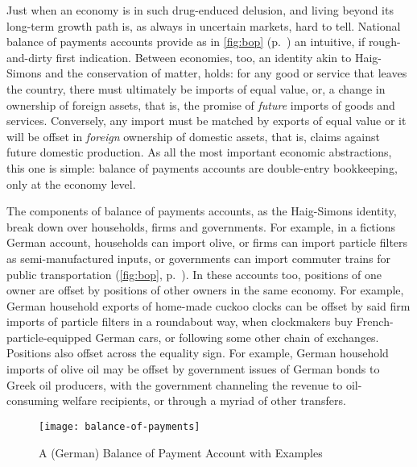 Just when an economy is in such drug-enduced delusion, and living beyond its long-term growth path is, as always in uncertain markets, hard to tell.
National balance of payments accounts provide as in \autoref{fig:bop} (p.~\pageref{fig:bop}) an intuitive, if rough-and-dirty first indication.
Between economies, too, an identity akin to Haig-Simons and the conservation of matter, holds:
for any good or service that leaves the country, there must ultimately be imports of equal value, or, a change in ownership of foreign assets, that is, the promise of \emph{future} imports of goods and services.
Conversely, any import must be matched by exports of equal value or it will be offset in \emph{foreign} ownership of domestic assets, that is, claims against future domestic production.
As all the most important economic abstractions, this one is simple:
balance of payments accounts are double-entry bookkeeping, only at the economy level.

The components of balance of payments accounts, as the Haig-Simons identity, break down over households, firms and governments.
For example, in a fictions German account, households can import olive, or firms can import particle filters as semi-manufactured inputs, or governments can import commuter trains for public transportation (\autoref{fig:bop}, p.~\pageref{fig:bop}).
In these accounts too, positions of one owner are offset by positions of other owners in the same economy.
For example, German household exports of home-made cuckoo clocks can be offset by said firm imports of particle filters in a roundabout way, when clockmakers buy French-particle-equipped German cars, or following some other chain of exchanges.
Positions  also offset across the equality sign.
For example, German household imports of olive oil may be offset by government issues of German bonds to Greek oil producers, with the government channeling the revenue to oil-consuming welfare recipients, or through a myriad of other transfers.

\begin{figure}[htbp]
	\begin{center}
	\texttt{[image: balance-of-payments]}
	\caption{A (German) Balance of Payment Account with Examples}
	\label{fig:bop}
	\end{center}
\end{figure}

